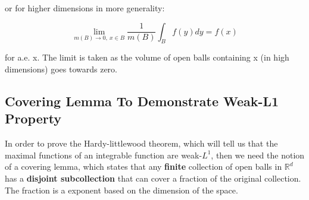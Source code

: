 \documentclass[class=article, crop=false]{standalone}
\begin{document}
		or for higher dimensions in more generality:

			$$\lim_{m(B) \rightarrow 0,\ x \in B} \frac{1}{m(B)} \int_B f(y) dy = f(x)$$

		for a.e. x. The limit is taken as the volume of open balls containing x (in high dimensions) goes towards zero.

		\subsection{Covering Lemma To Demonstrate Weak-L1 Property}
			In order to prove the Hardy-littlewood theorem, which will tell us that the maximal functions of an integrable function are weak-$L^1$, then we need the notion of a covering lemma, which states that any \textbf{finite} collection of open balls in $\mathbb{R}^d$ has a \textbf{disjoint subcollection} that can cover a fraction of the original collection. The fraction is a exponent based on the dimension of the space.
\end{document}
